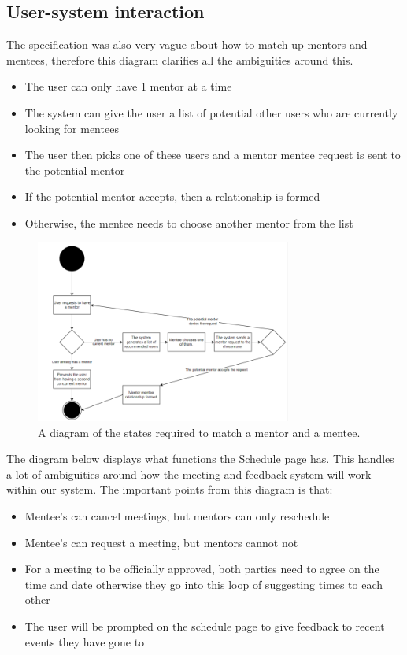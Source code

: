 \documentclass[10pt]{article}
\begin{document}
\subsection{User-system interaction}
The specification was also very vague about how to match up mentors and mentees,
therefore this diagram clarifies all the ambiguities around this.
\begin{itemize}
    \item The user can only have 1 mentor at a time
    \item The system can give the user a list of potential other users who are currently looking for mentees
    \item The user then picks one of these users and a mentor mentee request is sent to the potential mentor
    \item If the potential mentor accepts, then a relationship is formed
    \item Otherwise, the mentee needs to choose another mentor from the list
\end{itemize}

\begin{figure}[H]
    \centering
    \includegraphics[width=0.75\textwidth]{MentorMentee}
    \caption{A diagram of the states required to match a mentor and a mentee.}
    \label{fig:state_mentor_mentee_diagram}
\end{figure}

The diagram below displays what functions the Schedule page has. This handles a
lot of ambiguities around how the meeting and feedback system will work within
our system. The important points from this diagram is that:
\begin{itemize}
    \item Mentee's can cancel meetings, but mentors can only reschedule
    \item Mentee's can request a meeting, but mentors cannot not
    \item For a meeting to be officially approved, both parties need to agree on the time and date otherwise they go into this loop of suggesting times to each other
    \item The user will be prompted on the schedule page to give feedback to recent events they have gone to
\end{itemize}
\end{document}
